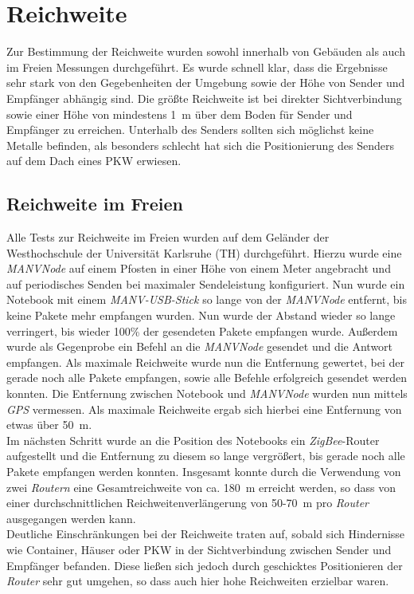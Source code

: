\section{Reichweite}
Zur Bestimmung der Reichweite wurden sowohl innerhalb von Gebäuden als auch im Freien Messungen durchgeführt. 
Es wurde schnell klar, dass die Ergebnisse sehr stark von den Gegebenheiten der Umgebung sowie der Höhe von
Sender und Empfänger abhängig sind. Die größte Reichweite ist bei direkter Sichtverbindung
sowie einer Höhe von mindestens 1~m über dem Boden für Sender und Empfänger zu erreichen. 
Unterhalb des Senders sollten sich möglichst keine Metalle befinden, als besonders schlecht hat sich die 
Positionierung des Senders auf dem Dach eines PKW erwiesen. 

\subsection{Reichweite im Freien}
Alle Tests zur Reichweite im Freien wurden auf dem Geländer der Westhochschule der Universität Karlsruhe (TH)
durchgeführt. Hierzu wurde eine \emph{MANVNode} auf einem Pfosten in einer Höhe von einem Meter angebracht
und auf periodisches Senden bei maximaler Sendeleistung konfiguriert.  Nun wurde ein Notebook mit einem 
\emph{MANV-USB-Stick} so lange von der \emph{MANVNode} entfernt, bis keine Pakete mehr empfangen wurden.
Nun wurde der Abstand wieder so lange verringert, bis wieder 100\% der gesendeten Pakete empfangen wurde.
Außerdem wurde als Gegenprobe ein Befehl an die \emph{MANVNode} gesendet und die Antwort empfangen. 
Als maximale Reichweite wurde nun die Entfernung gewertet, bei der gerade noch alle Pakete empfangen, 
sowie alle Befehle erfolgreich gesendet werden konnten. Die Entfernung zwischen Notebook und 
\emph{MANVNode} wurden nun mittels \emph{GPS} vermessen. Als maximale Reichweite ergab sich hierbei eine Entfernung
von etwas über 50~m.\\
Im nächsten Schritt wurde an die Position des Notebooks ein \emph{ZigBee}-Router aufgestellt und die Entfernung zu
diesem so lange vergrößert, bis gerade noch alle Pakete empfangen werden konnten. Insgesamt konnte durch
die Verwendung von zwei \emph{Routern} eine Gesamtreichweite von ca. 180~m erreicht werden, so dass von einer 
durchschnittlichen Reichweitenverlängerung von 50-70~m pro \emph{Router} ausgegangen werden kann.\\
Deutliche Einschränkungen bei der Reichweite traten auf, sobald sich Hindernisse wie Container, Häuser oder 
PKW in der Sichtverbindung zwischen Sender und Empfänger befanden. Diese ließen sich jedoch durch geschicktes
Positionieren der \emph{Router} sehr gut umgehen, so dass auch hier hohe Reichweiten erzielbar waren. 

